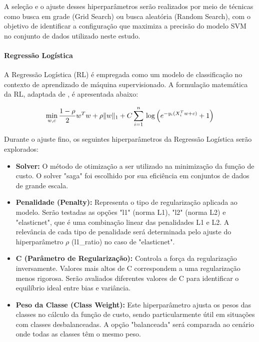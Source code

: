 A seleção e o ajuste desses hiperparâmetros serão realizados por meio de técnicas como busca em grade (Grid Search) ou busca aleatória (Random Search), com o objetivo de identificar a configuração que maximiza a precisão do modelo SVM no conjunto de dados utilizado neste estudo.

\paragraph{Regressão Logística}

A Regressão Logística (RL) é empregada como um modelo de classificação no contexto de aprendizado de máquina supervisionado. A formulação matemática da RL, adaptada de \cite{pedregosa2011scikit}, é apresentada abaixo:

\begin{equation}
\label{eq5}
\min_{w, c} \frac{1 - \rho}{2}w^T w + \rho \|w\|_1 + \\ C \sum_{i=1}^n \\ \log\left (e^{-y_i (X_i^T w + c)} + 1\right )
\end{equation}

Durante o ajuste fino, os seguintes hiperparâmetros da Regressão Logística serão explorados:

\begin{itemize}
    \item \textbf{Solver:} O método de otimização a ser utilizado na minimização da função de custo. O solver "saga" foi escolhido por sua eficiência em conjuntos de dados de grande escala.
    \item \textbf{Penalidade (Penalty):} Representa o tipo de regularização aplicada ao modelo. Serão testadas as opções "l1" (norma L1), "l2" (norma L2) e "elasticnet", que é uma combinação linear das penalidades L1 e L2. A relevância de cada tipo de penalidade será determinada pelo ajuste do hiperparâmetro \(\rho\) (l1\_ratio) no caso de "elasticnet".
    \item \textbf{C (Parâmetro de Regularização):} Controla a força da regularização inversamente. Valores mais altos de C correspondem a uma regularização menos rigorosa. Serão avaliados diferentes valores de C para identificar o equilíbrio ideal entre bias e variância.
    \item \textbf{Peso da Classe (Class Weight):} Este hiperparâmetro ajusta os pesos das classes no cálculo da função de custo, sendo particularmente útil em situações com classes desbalanceadas. A opção "balanceada" será comparada ao cenário onde todas as classes têm o mesmo peso.
\end{itemize}

